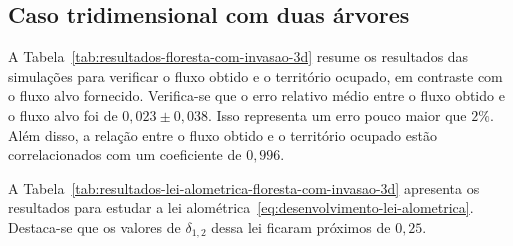 \begin{figure}[!htb]

  \label{fig:coeficiente-de-invasao-floresta-com-invasao-parte2}
\end{figure}

\subsection{Caso tridimensional com duas árvores}\label{sec:floresta-com-invasao-caso-3d}

A Tabela~\ref{tab:resultados-floresta-com-invasao-3d} resume os resultados
das simulações para verificar o fluxo obtido e o território ocupado, em contraste com o 
fluxo alvo fornecido.
Verifica-se que o erro relativo médio entre o fluxo obtido e o fluxo alvo foi 
de $0,023 \pm 0,038$. Isso representa um erro pouco maior que $2\%$. 
Além disso, a relação entre o fluxo obtido e o território ocupado estão correlacionados com um
coeficiente de $0,996$.

A Tabela~\ref{tab:resultados-lei-alometrica-floresta-com-invasao-3d} apresenta os resultados 
para estudar a lei alométrica~\eqref{eq:desenvolvimento-lei-alometrica}. Destaca-se que os valores
de $\delta_{1, 2}$ dessa lei ficaram próximos de $0,25$.

